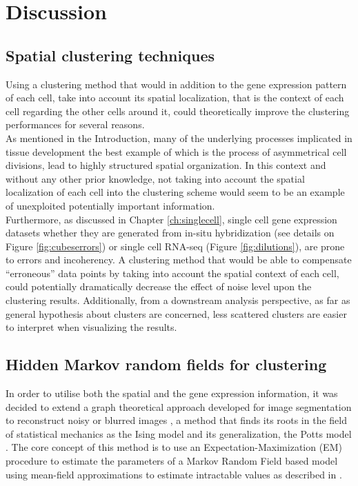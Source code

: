 \section{Discussion}
	\subsection{Spatial clustering techniques}
	Using a clustering method that would in addition to the gene expression pattern of each cell, take into account its spatial localization, that is the context of each cell regarding the other cells around it, could theoretically improve the clustering performances for several reasons.\\
	
	As mentioned in the Introduction, many of the underlying processes implicated in tissue development the best example of which is the process of asymmetrical cell divisions, lead to highly structured spatial organization. In this context and without any other prior knowledge, not taking into account the spatial localization of each cell into the clustering scheme would seem to be an example of unexploited potentially important information. \\
	
	Furthermore, as discussed in Chapter \ref{ch:singlecell}, single cell gene expression datasets whether they are generated from in-situ hybridization (see details on Figure \ref{fig:cubeserrors}) or single cell RNA-seq (Figure \ref{fig:dilutions}), are prone to errors and incoherency. A clustering method that would be able to compensate ``erroneous'' data points by taking into account the spatial context of each cell, could potentially dramatically decrease the effect of noise level upon the clustering results. Additionally, from a downstream analysis perspective, as far as general hypothesis about clusters are concerned, less scattered clusters are easier to interpret when visualizing the results.\\


	\subsection{Hidden Markov random fields for clustering}
In order to utilise both the spatial and the gene expression information, it was decided to extend a graph theoretical approach developed for image segmentation to reconstruct noisy or blurred images \cite{Dang98}, a method that finds its roots in the field of statistical mechanics as the Ising model \cite{Ising25} and its generalization, the Potts model \cite{Wu82}. The core concept of this method is to use an Expectation-Maximization (EM) procedure to estimate the parameters of a Markov Random Field based model using mean-field approximations to estimate intractable values as described in \cite{Celeux01}.\\

